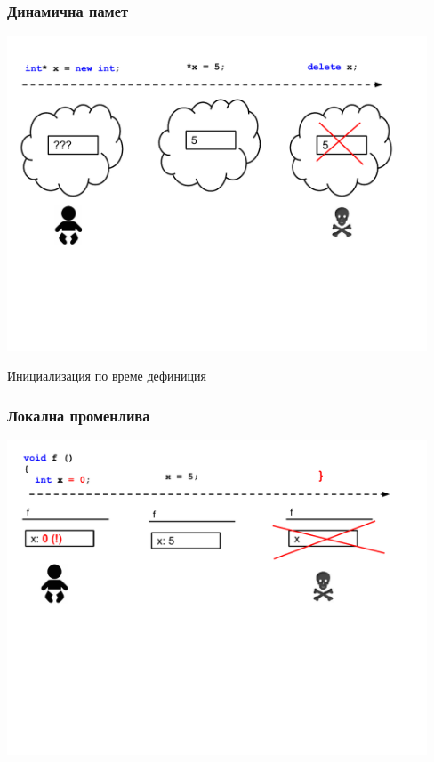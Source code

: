 \documentclass{beamer}
\begin{document}
\begin{frame}[fragile]
\frametitle{Динамична памет}
\includegraphics[width=12.5cm]{images/lc_heap}
\end{frame}



\begin{frame}
\centerline{Инициализация по време дефиниция}
\end{frame}



\begin{frame}[fragile]
\frametitle{Локална променлива}
\includegraphics[width=12.5cm]{images/lc_var_cons}
\end{frame}
\end{document}
